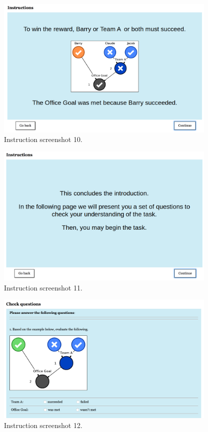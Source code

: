 \documentclass[11pt]{article}
\begin{document}
\begin{figure}[H]
	\centering
	\includegraphics[width=0.95\textwidth]{screenshot_10}
	\caption{Instruction screenshot 10.}
	\label{fig:screenshot_10}
\end{figure}
\begin{figure}[H]
	\centering
	\includegraphics[width=0.95\textwidth]{screenshot_11}
	\caption{Instruction screenshot 11.}
	\label{fig:screenshot_11}
\end{figure}
\begin{figure}[H]
	\centering
	\includegraphics[width=0.95\textwidth]{screenshot_12}
	\caption{Instruction screenshot 12.}
	\label{fig:screenshot_12}
\end{figure}
\end{document}

